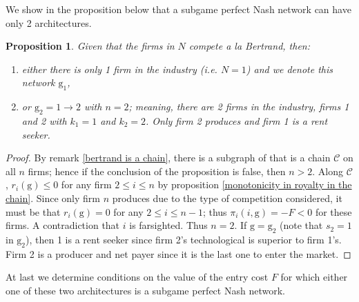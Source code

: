 \documentclass{article}
\newtheorem{proposition}{Proposition}
\begin{document}
We show in the proposition below that a subgame perfect Nash network can have only 2 architectures. \\

\begin{proposition}
Given that the firms in $N$ compete a la Bertrand, then: 
\begin{enumerate}
\item either there is only 1 firm in the industry (i.e. $N=1$) and we denote this network $\text{g}_1$,
\item or $\text{g}_2=1\rightarrow2$ with $n=2$; meaning, there are 2 firms in the industry, firms 1 and 2 with $k_1=1$ and $k_2=2$. Only firm 2 produces and firm 1 is a rent seeker.  
\end{enumerate}
\end{proposition}
\begin{proof}
By remark \ref{bertrand is a chain}, there is a subgraph of  that is a chain $\mathcal{C}$ on all $n$ firms; hence if the conclusion of the proposition is false, then $n>2$. Along $\mathcal{C}$, $r_i(\text{g})\leq 0$ for any firm $2\leq i\leq n$ by proposition \ref{monotonicity in royalty in the chain}. Since only firm $n$ produces due to the type of competition considered, it must be that $r_i(\text{g})=0$ for any $2\leq i\leq n-1$; thus $\pi_i(i,\text{g})=-F<0$ for these firms. A contradiction that $i$ is farsighted. Thus $n=2$. If $\text{g}=\text{g}_2$ (note that $s_2=1$ in $\text{g}_2$), then 1 is a rent seeker since firm 2's technological is superior to firm 1's. Firm 2 is a producer and net payer since it is the last one to enter the market. 
\end{proof}

At last we determine conditions on the value of the entry cost $F$ for which either one of these two architectures is a subgame perfect Nash network. \\
\end{document}
